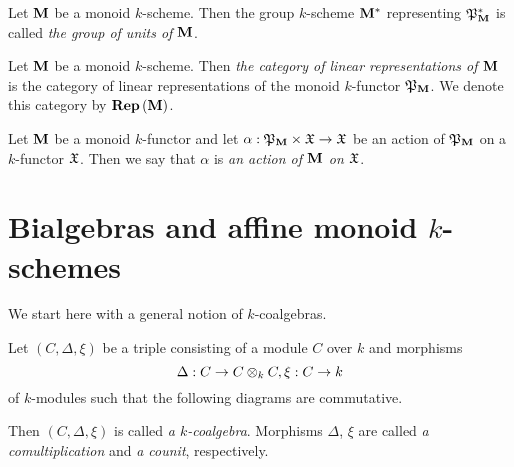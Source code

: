 \begin{definition}
Let $\mathbf{M}$ be a monoid $k$-scheme. Then the group $k$-scheme $\mathbf{M}^*$ representing ${\mathfrak P}_{\mathbf{M}}^*$ is called \textit{the group of units of $\mathbf{M}$}.
\end{definition}

\begin{definition}
Let $\mathbf{M}$ be a monoid $k$-scheme. Then \textit{the category of linear representations of $\mathbf{M}$} is the category of linear representations of the monoid $k$-functor ${\mathfrak P}_{\mathbf{M}}$. We denote this category by $\mathbf{Rep}\left(\mathbf{M}\right)$.
\end{definition}

\begin{definition}
Let $\mathbf{M}$ be a monoid $k$-functor and let $\alpha:{\mathfrak P}_{\mathbf{M}}\times {\mathfrak X}\rightarrow {\mathfrak X}$ be an action of ${\mathfrak P}_{\mathbf{M}}$ on a $k$-functor ${\mathfrak X}$. Then we say that $\alpha$ is \textit{an action of $\mathbf{M}$ on ${\mathfrak X}$}.
\end{definition}

\section{Bialgebras and affine monoid $k$-schemes}
\noindent
We start here with a general notion of $k$-coalgebras.

\begin{definition}
Let $(C,\Delta,\xi)$ be a triple consisting of a module $C$ over $k$ and morphisms
$$\Delta:C \rightarrow C\otimes_{k} C,\xi:C\rightarrow k$$
of $k$-modules such that the following diagrams are commutative.
\begin{center}
\end{center}
Then $(C,\Delta,\xi)$ is called \textit{a $k$-coalgebra}. Morphisms $\Delta$, $\xi$ are called \textit{a comultiplication} and \textit{a counit}, respectively.
\end{definition}

